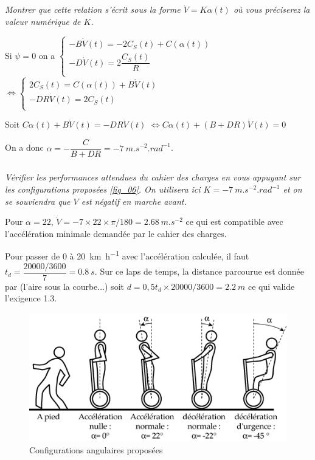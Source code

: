 \documentclass[10pt,fleqn]{article} %
\begin{document}
\subparagraph{\label{q_21}}\textit{Montrer que cette relation s’écrit sous la forme $\dot{V}  =K\alpha(t)$ où vous préciserez la valeur numérique de $K$.}
\ifprof
\begin{corrige}
Si  $\psi=0$ on a 
$
\left\{
\begin{array}{l}
 - B \dot{V}(t) = - 2C_S(t)+C\left(\alpha(t) \right) \\
 - D \dot{V}(t) = 2\dfrac{C_S(t)}{R} \\\end{array}
\right.
$
$ \Leftrightarrow 
\left\{
\begin{array}{l}
   2C_S(t) = C\left(\alpha(t) \right) +B \dot{V}(t) \\
 - DR\dot{V}(t) = 2C_S(t) \\\end{array}
\right.
$

Soit $C\alpha(t)  +B \dot{V}(t)= - DR\dot{V}(t)$ 
$\Leftrightarrow C\alpha(t)  +\left(B + DR\right)\dot{V}(t)= 0$ 

On a donc $\alpha = - \dfrac{C}{B + DR} = -\SI{7}{m.s^{-2}.rad^{-1}}$.

\end{corrige}
\else
\fi

\subparagraph{\label{q_22}}\textit{Vérifier les performances attendues du cahier des charges en vous appuyant sur les configurations proposées \autoref{fig_06}. On utilisera ici $K = -\SI{7}{m.s^{-2}.rad^{-1}}$ et on se souviendra que $V$ est négatif en marche avant.}
\ifprof
\begin{corrige}

Pour $\alpha = 22$, $\dot{V}=-7 \times 22 \times \pi /180 =\SI{2,68}{m.s^{-2}}$ ce qui est compatible avec l'accélération minimale demandée par le cahier des charges. 


Pour passer de 0 à \SI{20}{km.h^{-1}} avec l'accélération calculée, il faut $t_d = \dfrac{20 000/3600}{7}=\SI{0,8}{s}$. Sur ce laps de temps, la distance parcourue est donnée par (l'aire sous la courbe...) soit $d=0,5 t_d \times 20 000/3600 = \SI{2,2}{m}$ ce qui valide l'exigence 1.3.
\end{corrige}
\else
\fi

\ifprof
\else
\begin{figure}[H]
\centering
\includegraphics[width=0.9\linewidth]{fig_06}
\caption{Configurations angulaires proposées \label{fig_06}}
\end{figure}
\fi
\end{document}

